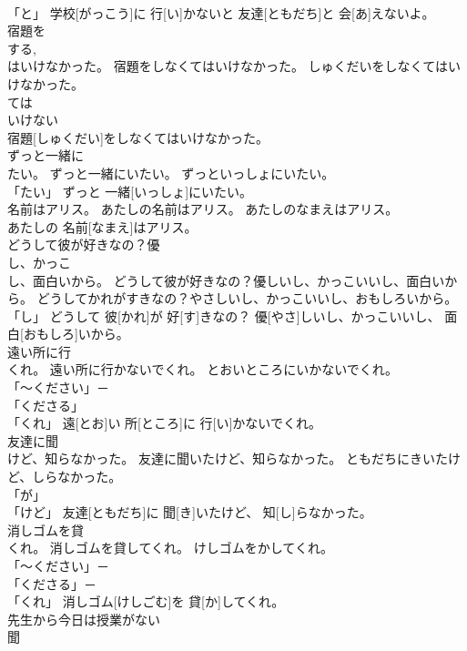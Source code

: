 \documentclass[8pt]{extreport}
\begin{document}
\begin{CJK}{UTF8}{min}
\\	「と」	学校[がっこう]に 行[い]かないと 友達[ともだち]と 会[あ]えないよ。		
\\	宿題を
\\	する, 
\\	はいけなかった。	宿題をしなくてはいけなかった。	しゅくだいをしなくてはいけなかった。	
\\	ては
\\	いけない
\\	宿題[しゅくだい]をしなくてはいけなかった。		
\\	ずっと一緒に
\\	たい。	ずっと一緒にいたい。	ずっといっしょにいたい。	
\\	「たい」	ずっと 一緒[いっしょ]にいたい。		
\\	名前はアリス。	あたしの名前はアリス。	あたしのなまえはアリス。	
\\	あたしの 名前[なまえ]はアリス。		
\\	どうして彼が好きなの？優
\\	し、かっこ
\\	し、面白いから。	どうして彼が好きなの？優しいし、かっこいいし、面白いから。	どうしてかれがすきなの？やさしいし、かっこいいし、おもしろいから。	
\\	「し」	どうして 彼[かれ]が 好[す]きなの？ 優[やさ]しいし、かっこいいし、 面白[おもしろ]いから。		
\\	遠い所に行
\\	くれ。	遠い所に行かないでくれ。	とおいところにいかないでくれ。	
\\	「～ください」－ 
\\	「くださる」 
\\	「くれ」	遠[とお]い 所[ところ]に 行[い]かないでくれ。		
\\	友達に聞
\\	けど、知らなかった。	友達に聞いたけど、知らなかった。	ともだちにきいたけど、しらなかった。	
\\	「が」 
\\	「けど」	友達[ともだち]に 聞[き]いたけど、 知[し]らなかった。		
\\	消しゴムを貸
\\	くれ。	消しゴムを貸してくれ。	けしゴムをかしてくれ。	
\\	「～ください」－ 
\\	「くださる」－
\\	「くれ」	消しゴム[けしごむ]を 貸[か]してくれ。		
\\	先生から今日は授業がない
\\	聞

\end{CJK}
\end{document}

